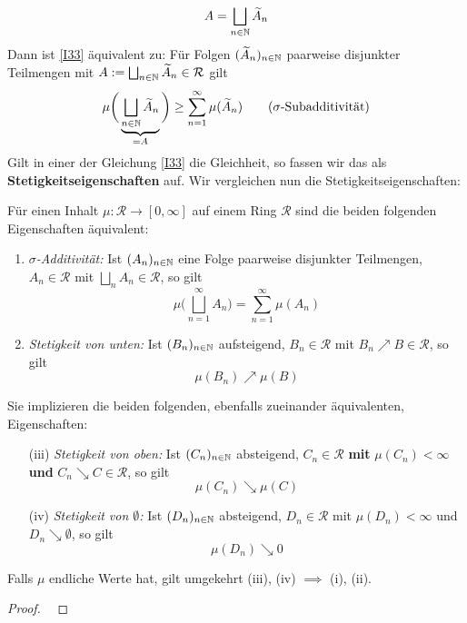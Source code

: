 \begin{equation*}
	A = \bigsqcup_{n\in \mathbb{N}} \widetilde{A}_n
\end{equation*}
Dann ist \eqref{I33} äquivalent zu: Für Folgen $(\widetilde{A}_n)_{n \in \mathbb{N}}$ paarweise disjunkter Teilmengen mit $A:=\bigsqcup_{n\in\mathbb{N}}\widetilde{A}_n \in \mathcal{R}$ gilt
\begin{equation*}
\mu\bigg( \underbrace{\bigsqcup_{n\in \mathbb{N}} \widetilde{A}_n}_{=A} \bigg) \geq \sum_{n=1}^\infty \mu(\widetilde{A}_n)
\tag{$\sigma$-Subadditivität}
\end{equation*}
Gilt in einer der Gleichung \eqref{I33} die Gleichheit, so fassen wir das als \textbf{Stetigkeitseigenschaften} auf. Wir vergleichen nun die Stetigkeitseigenschaften:

\begin{proposition}
\begin{mdframed}
Für einen Inhalt $\mu : \mathcal{R} \longrightarrow [0,\infty]$ auf einem Ring $\mathcal{R}$ sind die beiden folgenden Eigenschaften äquivalent:
\begin{enumerate}[(\roman*),topsep=5pt, itemsep = 0 pt]
	\item \emph{$\sigma$-Additivität:} Ist $(A_n)_{n \in \mathbb{N}}$ eine Folge paarweise disjunkter Teilmengen, $A_n \in \mathcal{R}$ mit $\bigsqcup_nA_n \in \mathcal{R}$, so gilt
	$$
	\mu \bigg(\bigsqcup_{n=1}^\infty A_n \bigg) = \sum_{n=1}^\infty \mu (A_n)	
	$$
	\item \textit{Stetigkeit von unten:} Ist $(B_n)_{n\in\mathbb{N}}$ aufsteigend, $B_n \in \mathcal{R}$ mit $B_n \nearrow B \in \mathcal{R}$, so gilt
	$$
	\mu (B_n) \nearrow \mu (B)	
	$$
\end{enumerate}
	Sie implizieren die beiden folgenden, ebenfalls zueinander äquivalenten, Eigenschaften:
	\begin{enumerate}[(\roman*),topsep=5pt, itemsep = 0 pt]
	\item[(iii)] \emph{Stetigkeit von oben:} Ist $(C_n)_{n \in \mathbb{N}}$ absteigend, $C_n \in \mathcal{R}$ \textbf{mit} $\mu(C_n) < \infty$ \textbf{und} $C_n \searrow C \in \mathcal{R}$, so gilt
	$$
	\mu(C_n) \searrow \mu (C)	
	$$
	\item[(iv)] \emph{Stetigkeit von $\emptyset$:} Ist $(D_n)_{n \in \mathbb{N}}$ absteigend, $D_n \in \mathcal{R}$ mit $\mu(D_n) < \infty$ und $D_n \searrow \emptyset$, so gilt
	$$ \mu (D_n) \searrow 0$$
	\end{enumerate}
	Falls $\mu$ endliche Werte hat, gilt umgekehrt (iii), (iv) $\implies$ (i), (ii).
\end{mdframed}
\begin{proof}\

\end{proof}
\end{proposition}
